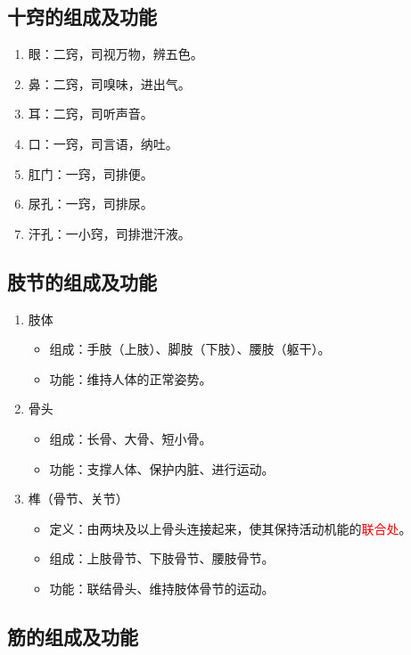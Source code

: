 \documentclass[cn,blue,12pt,normal,founder]{elegantnote}
\newcommand{\redt}[1]{\textcolor{red}{{}#1}}      %
\begin{document}
\subsection{十窍的组成及功能}

\begin{enumerate}
  \item 眼：二窍，司视万物，辨五色。
  \item 鼻：二窍，司嗅味，进出气。
  \item 耳：二窍，司听声音。
  \item 口：一窍，司言语，纳吐。
  \item 肛门：一窍，司排便。
  \item 尿孔：一窍，司排尿。
  \item 汗孔：一小窍，司排泄汗液。
\end{enumerate}

\subsection{肢节的组成及功能}

\begin{enumerate}
  \item 肢体
  \begin{itemize}
    \item 组成：手肢（上肢）、脚肢（下肢）、腰肢（躯干）。
    \item 功能：维持人体的正常姿势。
  \end{itemize}
  \item 骨头
  \begin{itemize}
    \item 组成：长骨、大骨、短小骨。
    \item 功能：支撑人体、保护内脏、进行运动。
  \end{itemize}
  \item 榫（骨节、关节）
  \begin{itemize}
    \item 定义：由两块及以上骨头连接起来，使其保持活动机能的\redt{联合处}。
    \item 组成：上肢骨节、下肢骨节、腰肢骨节。
    \item 功能：联结骨头、维持肢体骨节的运动。
  \end{itemize}
\end{enumerate}

\subsection{筋的组成及功能}
\end{document}
